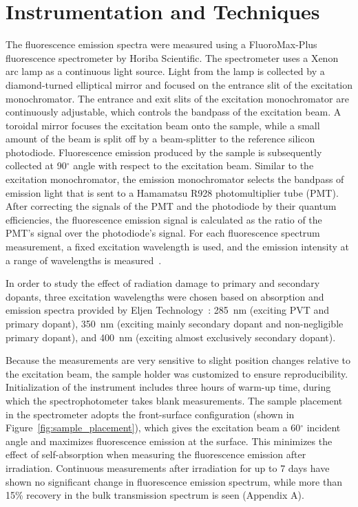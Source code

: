 \documentclass[review]{elsarticle}
\begin{document}
\section{Instrumentation and Techniques}
The fluorescence emission spectra were measured using a FluoroMax-Plus fluorescence spectrometer by Horiba Scientific. 
The spectrometer uses a Xenon arc lamp as a continuous light source. 
Light from the lamp is collected by a diamond-turned elliptical mirror and focused on the entrance slit of the excitation monochromator.
The entrance and exit slits of the excitation monochromator are continuously adjustable, 
which controls the bandpass of the excitation beam. 
A toroidal mirror focuses the excitation beam onto the sample, while a small amount of the beam is split off by a beam-splitter 
to the reference silicon photodiode. 
Fluorescence emission produced by the sample is subsequently collected at 90$^\circ$ angle with respect to the excitation beam. 
Similar to the excitation monochromator, the emission monochromator selects the bandpass of emission light that is sent to 
a Hamamatsu R928 photomultiplier tube (PMT). 
After correcting the signals of the PMT and the photodiode by their quantum efficiencies, 
the fluorescence emission signal is calculated as the ratio of the PMT's signal over the photodiode's signal. 
For each fluorescence spectrum measurement, a fixed excitation wavelength is used, 
and the emission intensity at a range of wavelengths is measured~\cite{horiba}. 

In order to study the effect of radiation damage to primary and secondary dopants, three excitation wavelengths were chosen based on 
absorption and emission spectra provided by Eljen Technology~\cite{chuck}: 
285~nm (exciting PVT and primary dopant), 
350~nm (exciting mainly secondary dopant and non-negligible primary dopant),
and 400~nm (exciting almost exclusively secondary dopant).

Because the measurements are very sensitive to slight position changes relative to the excitation beam, 
the sample holder was customized to ensure reproducibility. 
Initialization of the instrument includes three hours of warm-up time, during which the spectrophotometer takes blank measurements. 
The sample placement in the spectrometer adopts the front-surface configuration (shown in Figure~\ref{fig:sample_placement}), 
which gives the excitation beam a 60$^\circ$ incident angle and maximizes fluorescence emission at the surface. 
This minimizes the effect of self-absorption when measuring the fluorescence emission after irradiation. 
Continuous measurements after irradiation for up to 7 days have shown no significant change in fluorescence emission spectrum, 
while more than 15\% recovery in the bulk transmission spectrum is seen (Appendix A).
\end{document}
